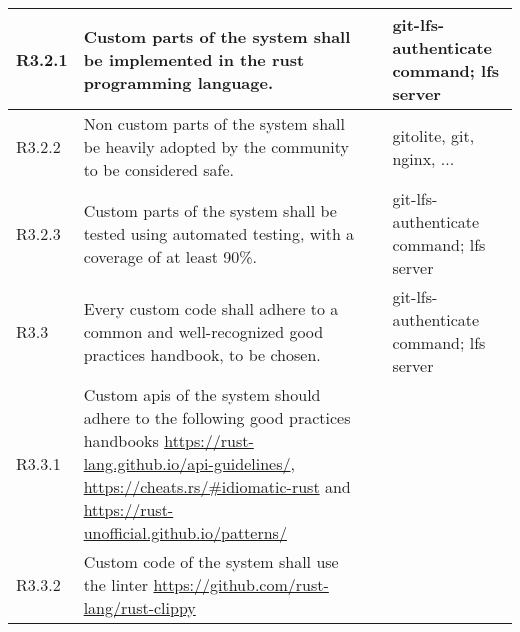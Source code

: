 \begin{landscape}
\begin{longtable}{|p{1cm}|p{19cm}|p{2cm}|p{3cm}|}
        \rowcolor[HTML]{EEFFEE}        R3.2.1     & Custom parts of the system shall be implemented in the rust programming language.                                                                                                                                                                                                     &                       & git-lfs-authenticate command; lfs server \\\hline
        \rowcolor[HTML]{EEFFEE}        R3.2.2     & Non custom parts of the system shall be heavily adopted by the community to be considered safe.                                                                                                                                                                                       &                       & gitolite, git, nginx, ...                \\\hline
        \rowcolor[HTML]{EEFFEE}        R3.2.3     & Custom parts of the system shall be tested using automated testing, with a coverage of at least 90\%.                                                                                                                                                                                 &                       & git-lfs-authenticate command; lfs server \\\hline
        \rowcolor[HTML]{DDFFDD}        R3.3       & Every custom code shall adhere to a common and well-recognized good practices handbook, to be chosen.                                                                                                                                                                                 &                       & git-lfs-authenticate command; lfs server \\ \hline
        \rowcolor[HTML]{EEFFEE}        R3.3.1     & Custom apis of the system should adhere to the following good practices handbooks \url{https://rust-lang.github.io/api-guidelines/}, \url{https://cheats.rs/#idiomatic-rust} and \url{https://rust-unofficial.github.io/patterns/}                                                    &                       &                                          \\\hline
        \rowcolor[HTML]{EEFFEE}        R3.3.2     & Custom code of the system shall use the linter \url{https://github.com/rust-lang/rust-clippy}                                                                                                                                                                                         &                       &                                          \\\hline

\end{longtable}
\end{landscape}
